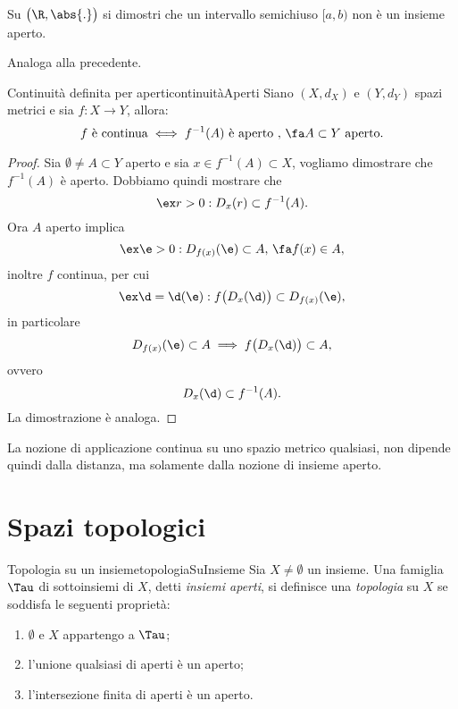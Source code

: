 \begin{exe}
    Su $\big(\R,\abs{.}\big)$ si dimostri che un intervallo semichiuso $[a,b)$ non è un insieme aperto.
\end{exe}

\begin{sol}
    Analoga alla precedente.
\end{sol}

\begin{teor}{Continuità definita per aperti}{continuitàAperti}
    Siano $(X,d_X)$ e $(Y,d_Y)$ spazi metrici e sia $f\colon X\to Y$, allora:
    \[
        f\text{ è continua}\iff f^{-1}(A)\text{ è aperto },\,\fa A\subset Y\text{ aperto.}
    \]
\end{teor}

\begin{proof}
    \graffito{$\Rightarrow)$}Sia $\emptyset\neq A\subset Y$ aperto e sia $x\in f^{-1}(A)\subset X$, vogliamo dimostrare che $f^{-1}(A)$ è aperto.
    Dobbiamo quindi mostrare che
    \[
        \ex r>0:D_x(r)\subset f^{-1}(A).
    \]
    Ora $A$ aperto implica
    \[
        \ex\e>0:D_{f(x)}(\e)\subset A,\,\fa f(x)\in A,
    \]
    inoltre $f$ continua, per cui
    \[
        \ex\d=\d(\e):f\big(D_x(\d)\big)\subset D_{f(x)}(\e),
    \]
    in particolare
    \[
        D_{f(x)}(\e)\subset A\implies f\big(D_x(\d)\big)\subset A,
    \]
    ovvero
    \[
        D_x(\d)\subset f^{-1}(A).
    \]
    \graffito{$\Leftarrow)$}La dimostrazione è analoga.
\end{proof}

\begin{oss}
    La nozione di applicazione continua su uno spazio metrico qualsiasi, non dipende quindi dalla distanza, ma solamente dalla nozione di insieme aperto.
\end{oss}
%
%
\section{Spazi topologici}

\begin{defn}{Topologia su un insieme}{topologiaSuInsieme}
    Sia \(X\neq\emptyset\) un insieme.
    Una famiglia \(\Tau\) di sottoinsiemi di \(X\), detti \emph{insiemi aperti}, si definisce una \emph{topologia} su \(X\) se soddisfa le seguenti proprietà:
    \begin{enumerate}
        \item \(\emptyset\) e \(X\) appartengo a \(\Tau\);
        \item l'unione qualsiasi di aperti è un aperto;
        \item l'intersezione finita di aperti è un aperto.
    \end{enumerate}
\end{defn}

